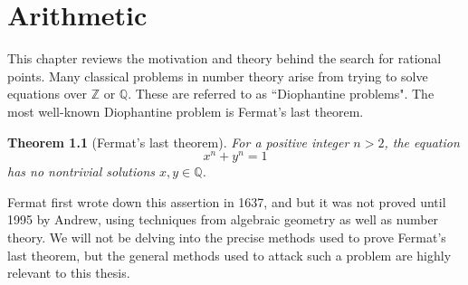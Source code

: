 \documentclass[12pt,twoside]{reedthesis}
\theoremstyle{plain}
\newtheorem{theorem}{Theorem}[chapter]
\theoremstyle{definition}
\theoremstyle{remark}
\newcommand{\ZZ}{\mathbb{Z}}
\newcommand{\QQ}{\mathbb{Q}}
\begin{document}
\chapter{Arithmetic}
This chapter reviews the motivation and theory behind the search for rational points. Many classical problems in number theory arise from trying to solve equations over $\ZZ$ or $\QQ$. These are referred to as ``Diophantine problems". The most well-known Diophantine problem is Fermat's last theorem.
\begin{theorem}[Fermat's last theorem]
For a positive integer $n>2$, the equation \[x^n+y^n=1\] has no nontrivial solutions $x,y\in\QQ$.
\end{theorem}
\noindent Fermat first wrote down this assertion in 1637, and but it was not proved until 1995 by Andrew, using techniques from algebraic geometry as well as number theory. We will not be delving into the precise methods used to prove Fermat's last theorem, but the general methods used to attack such a problem are highly relevant to this thesis.
\end{document}

